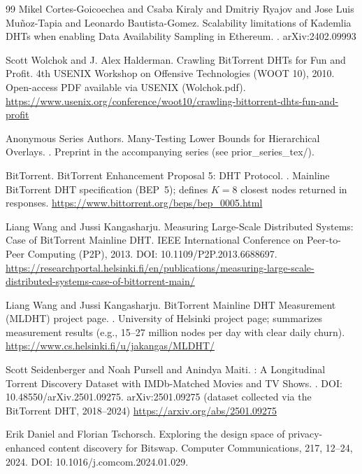 \documentclass[11pt]{article}
\begin{document}
\begin{thebibliography}{99}
Mikel Cortes-Goicoechea and Csaba Kiraly and Dmitriy Ryajov and Jose Luis Mu{\~n}oz-Tapia and Leonardo Bautista-Gomez.
\newblock Scalability limitations of Kademlia DHTs when enabling Data Availability Sampling in Ethereum.
.
\newblock arXiv:2402.09993

Scott Wolchok and J. Alex Halderman.
\newblock Crawling {BitTorrent} {DHTs} for Fun and Profit.
\newblock 4th USENIX Workshop on Offensive Technologies (WOOT 10), 2010.
\newblock Open-access PDF available via USENIX (Wolchok.pdf).
\newblock \url{https://www.usenix.org/conference/woot10/crawling-bittorrent-dhts-fun-and-profit}

Anonymous Series Authors.
\newblock Many-Testing Lower Bounds for Hierarchical Overlays.
.
\newblock Preprint in the accompanying series (see prior\_series\_tex/).

{BitTorrent}.
\newblock BitTorrent Enhancement Proposal 5: {DHT} Protocol.
.
\newblock Mainline BitTorrent DHT specification (BEP~5); defines $K=8$ closest nodes returned in responses.
\newblock \url{https://www.bittorrent.org/beps/bep_0005.html}

Liang Wang and Jussi Kangasharju.
\newblock Measuring Large-Scale Distributed Systems: Case of BitTorrent Mainline {DHT}.
\newblock IEEE International Conference on Peer-to-Peer Computing (P2P), 2013.
\newblock DOI: 10.1109/P2P.2013.6688697.
\newblock \url{https://researchportal.helsinki.fi/en/publications/measuring-large-scale-distributed-systems-case-of-bittorrent-main/}

Liang Wang and Jussi Kangasharju.
\newblock BitTorrent Mainline {DHT} Measurement (MLDHT) project page.
.
\newblock University of Helsinki project page; summarizes measurement results (e.g., 15--27 million nodes per day with clear daily churn).
\newblock \url{https://www.cs.helsinki.fi/u/jakangas/MLDHT/}

Scott Seidenberger and Noah Pursell and Anindya Maiti.
: A Longitudinal Torrent Discovery Dataset with IMDb-Matched Movies and TV Shows.
.
\newblock DOI: 10.48550/arXiv.2501.09275.
\newblock arXiv:2501.09275 (dataset collected via the BitTorrent DHT, 2018--2024)
\newblock \url{https://arxiv.org/abs/2501.09275}

Erik Daniel and Florian Tschorsch.
\newblock Exploring the design space of privacy-enhanced content discovery for Bitswap.
\newblock Computer Communications, 217, 12--24, 2024.
\newblock DOI: 10.1016/j.comcom.2024.01.029.


\end{thebibliography}
\end{document}

